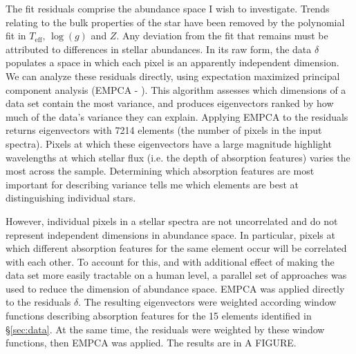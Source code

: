\documentclass[preprint]{aastex}
\begin{document}
The fit residuals comprise the abundance space I wish to investigate. Trends relating to the bulk properties of the star have been removed by the polynomial fit in $T_{\mathrm{eff}},\,\log(g)$ and $Z$. Any deviation from the fit that remains must be attributed to differences in stellar abundances. In its raw form, the data $\delta$ populates a space in which each pixel is an apparently independent dimension. We can analyze these residuals directly, using expectation maximized principal component analysis (EMPCA - \citealt{empca}).  This algorithm assesses which dimensions of a data set contain the most variance, and produces eigenvectors ranked by how much of the data's variance they can explain. Applying EMPCA to the residuals returns eigenvectors with 7214 elements (the number of pixels in the input spectra). Pixels at which these eigenvectors have a large magnitude highlight wavelengths at which stellar flux (i.e. the depth of absorption features) varies the most across the sample. Determining which absorption features are most important for describing variance tells me which elements are best at distinguishing individual stars.

However, individual pixels in a stellar spectra are not uncorrelated and do not represent independent dimensions in abundance space. In particular, pixels at which different absorption features for the same element occur will be correlated with each other. To account for this, and with additional effect of making the data set more easily tractable on a human level, a parallel set of approaches was used to reduce the dimension of abundance space. EMPCA was applied directly to the residuals $\delta$. The resulting eigenvectors were weighted according window functions describing absorption features for the 15 elements identified in \S \ref{sec:data}. At the same time, the residuals were weighted by these window functions, then EMPCA was applied. The results are in A FIGURE.

\end{document}
